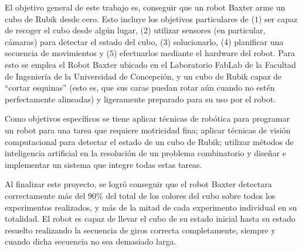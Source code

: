 El objetivo general de este trabajo es, conseguir que un robot Baxter arme un cubo de Rubik desde cero. Esto incluye los objetivos particulares de ($1$) ser capaz de recoger el cubo desde algún lugar, ($2$) utilizar sensores (en particular, cámaras) para detectar el estado del cubo, ($3$) solucionarlo, ($4$) planificar una secuencia de movimientos y ($5$) efectuarlos mediante el hardware del robot. Para esto se emplea el Robot Baxter ubicado en el Laboratorio FabLab de la Facultad de Ingeniería de la Universidad de Concepción, y un cubo de Rubik capaz de ``cortar esquinas'' (esto es, que sus caras puedan rotar aún cuando no estén perfectamente alineadas) y ligeramente preparado para su uso por el robot.

Como objetivos específicos se tiene aplicar técnicas de robótica para programar un robot para una tarea que requiere motricidad fina; aplicar técnicas de visión computacional para detectar el estado de un cubo de Rubik; utilizar métodos de inteligencia artificial en la resolución de un problema combinatorio y diseñar e implementar un sistema que integre todas estas tareas.

Al finalizar este proyecto, se logró conseguir que el robot Baxter detectara correctamente más del 90\% del total de los colores del cubo sobre todos los experimentos realizados, y más de la mitad de cada experimento individual en su totalidad. El robot es capaz de llevar el cubo de su estado inicial hasta su estado resuelto realizando la secuencia de giros correcta completamente, siempre y cuando dicha secuencia no sea demasiado larga.
